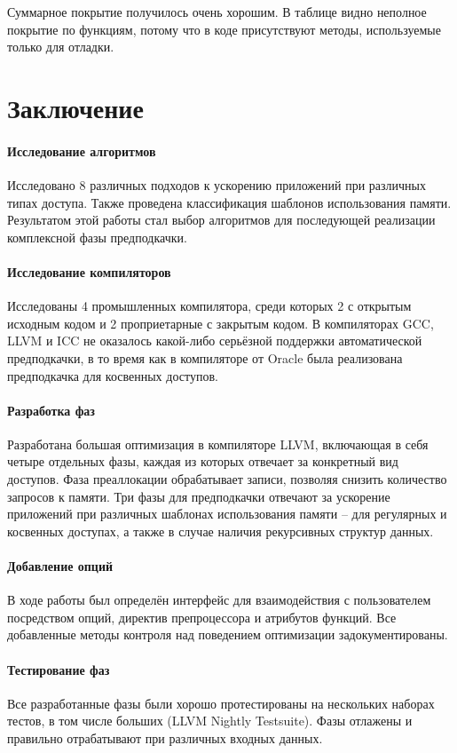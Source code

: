 \documentclass[12pt,a4paper,oneside]{article}
\begin{document}
Суммарное покрытие получилось очень хорошим. В таблице видно неполное покрытие по функциям, потому что в коде присутствуют методы, используемые только для отладки.

\newpage

\section{Заключение}

\paragraph{Исследование алгоритмов}

Исследовано 8 различных подходов к ускорению приложений при различных типах доступа. Также проведена классификация шаблонов использования памяти. Результатом этой работы стал выбор алгоритмов для последующей реализации комплексной фазы предподкачки.

\paragraph{Исследование компиляторов}

Исследованы 4 промышленных компилятора, среди которых 2 с открытым исходным кодом и 2 проприетарные с закрытым кодом. В компиляторах GCC, LLVM и ICC не оказалось какой-либо серьёзной поддержки автоматической предподкачки, в то время как в компиляторе от Oracle была реализована предподкачка для косвенных доступов.

\paragraph{Разработка фаз}

Разработана большая оптимизация в компиляторе LLVM, включающая в себя четыре отдельных фазы, каждая из которых отвечает за конкретный вид доступов. Фаза преаллокации обрабатывает записи, позволяя снизить количество запросов к памяти. Три фазы для предподкачки отвечают за ускорение приложений при различных шаблонах использования памяти -- для регулярных и косвенных доступах, а также в случае наличия рекурсивных структур данных.

\paragraph{Добавление опций}

В ходе работы был определён интерфейс для взаимодействия с пользователем посредством опций, директив препроцессора и атрибутов функций. Все добавленные методы контроля над поведением оптимизации задокументированы.

\paragraph{Тестирование фаз}

Все разработанные фазы были хорошо протестированы на нескольких наборах тестов, в том числе больших (LLVM Nightly Testsuite). Фазы отлажены и правильно отрабатывают при различных входных данных.

\newpage
{}

\end{document}
